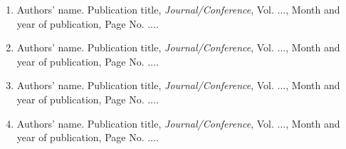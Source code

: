 \begin{listpublication}
\setlength{\parskip}{12pt}
\setlength{\parindent}{10mm} 
\onehalfspacing

\noindent
\begin{enumerate}[label={\theenumi)}, labelsep=6.5mm, leftmargin=20mm]
\item Authors' name. Publication title,  {\em Journal/Conference}, Vol. $\ldots$, Month and year of publication, Page No. $\ldots$.
\item Authors' name. Publication title,  {\em Journal/Conference}, Vol. $\ldots$, Month and year of publication, Page No. $\ldots$.
\item Authors' name. Publication title,  {\em Journal/Conference}, Vol. $\ldots$, Month and year of publication, Page No. $\ldots$.
\item Authors' name. Publication title,  {\em Journal/Conference}, Vol. $\ldots$, Month and year of publication, Page No. $\ldots$.

\end{enumerate}


\end{listpublication}
